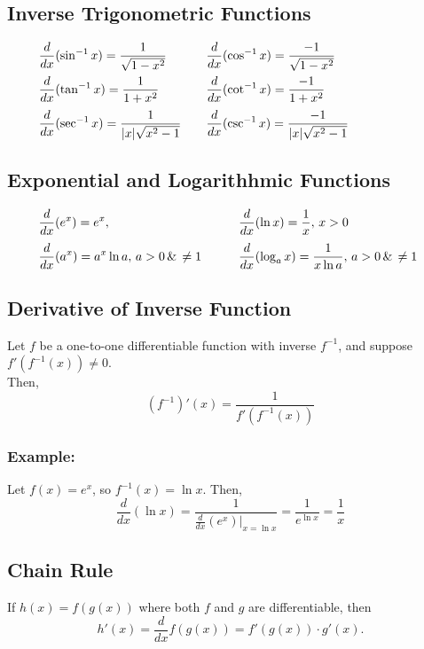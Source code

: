\documentclass[11pt]{article}
\begin{document}
\subsection{Inverse Trigonometric Functions}
$
    \begin{array}{l@{\qquad}l}
        \qquad\displaystyle \frac{d}{dx}(\sin^{-1} x) = \frac{1}{\sqrt{1 - x^2}} 
        & \displaystyle \frac{d}{dx}(\cos^{-1} x) = \frac{-1}{\sqrt{1 - x^2}} \\[10pt]
        \qquad\displaystyle \frac{d}{dx}(\tan^{-1} x) = \frac{1}{1 + x^2} 
        & \displaystyle \frac{d}{dx}(\cot^{-1} x) = \frac{-1}{1 + x^2} \\[10pt]
        \qquad\displaystyle \frac{d}{dx}(\sec^{-1} x) = \frac{1}{|x|\sqrt{x^2 - 1}} 
        & \displaystyle \frac{d}{dx}(\csc^{-1} x) = \frac{-1}{|x|\sqrt{x^2 - 1}}
    \end{array}
$
\subsection{Exponential and Logarithhmic Functions}
$
    \begin{array}{l@{\qquad}l}
        \qquad\displaystyle \frac{d}{dx}(e^x) = e^x, & \displaystyle \frac{d}{dx}(\ln x) = \frac{1}{x},\,x>0\\[10pt]
        \qquad\displaystyle \frac{d}{dx}(a^x) = a^x \ln a,\,a>0 \,\&\,\neq 1 \quad & \displaystyle \frac{d}{dx}(\log_a x) = \frac{1}{x \ln a},\,a>0 \,\&\,\neq 1
    \end{array}
$
\subsection{Derivative of Inverse Function}
Let $f$ be a one-to-one differentiable function with inverse $f^{-1}$, and suppose $f'(f^{-1}(x)) \neq 0$. \\Then,
\[
    \left(f^{-1}\right)'(x) = \frac{1}{f'\left(f^{-1}(x)\right)}
\]
\subsubsection*{Example:} Let $f(x) = e^x$, so $f^{-1}(x) = \ln x$. Then,
\[
    \frac{d}{dx}(\ln x) = \frac{1}{\frac{d}{dx}(e^x)|_{x = \ln x}} = \frac{1}{e^{\ln x}} = \frac{1}{x}
\]
\subsection{Chain Rule}
If $h(x) = f(g(x))$ where both $f$ and $g$ are differentiable, then
\[
    h'(x) = \frac{d}{dx} f(g(x)) = f'(g(x)) \cdot g'(x).
\]
\end{document}
